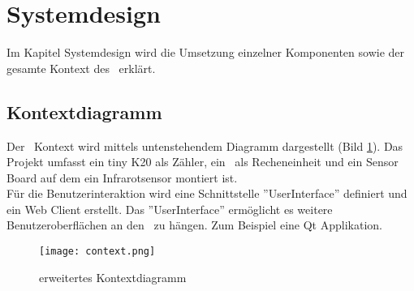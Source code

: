 \section{Systemdesign}
    Im Kapitel Systemdesign wird die Umsetzung einzelner Komponenten sowie der gesamte Kontext des \documenttitle\ erklärt.
        \subsection{Kontextdiagramm}
        Der \documenttitle\ Kontext wird mittels untenstehendem Diagramm dargestellt (Bild \ref{fig:kontext}). Das Projekt umfasst ein tiny K20 als Zähler, ein \rpi\ als Recheneinheit und ein Sensor Board auf dem ein Infrarotsensor montiert ist.\\
        Für die Benutzerinteraktion wird eine Schnittstelle ''UserInterface'' definiert und ein Web Client erstellt. Das ''UserInterface'' ermöglicht es weitere Benutzeroberflächen an den \documenttitle\ zu hängen. Zum Beispiel eine Qt Applikation.
        \begin{figure}[H]
            \centering
            \texttt{[image: context.png]}
            \caption{erweitertes Kontextdiagramm}
            \label{fig:kontext}
        \end{figure}


        \clearpage
        
        
        \clearpage
		
        \clearpage
		
        \clearpage
        
        \clearpage
        
        \clearpage
        
        \clearpage
        
        \clearpage
		